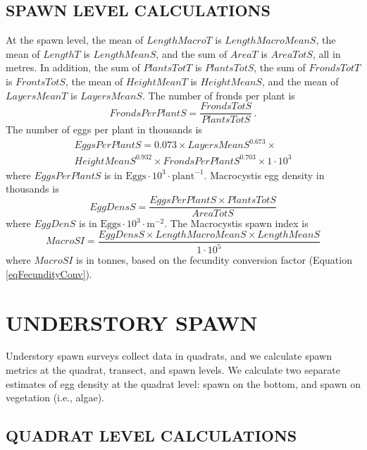 \documentclass[12pt]{article}
\begin{document}
\subsection{SPAWN LEVEL CALCULATIONS}

At the spawn level, the mean of $LengthMacroT$ is $LengthMacroMeanS$, the mean of $LengthT$ is $LengthMeanS$, and the sum of $AreaT$ is $AreaTotS$, all in metres.
In addition, the sum of $PlantsTotT$ is $PlantsTotS$, the sum of $FrondsTotT$ is $FrontsTotS$, the mean of $HeightMeanT$ is $HeightMeanS$, and the mean of $LayersMeanT$ is $LayersMeanS$. 
The number of fronds per plant is
\begin{equation}
FrondsPerPlantS = \frac{FrondsTotS} {PlantsTotS} \, .
\label{eqFrondsPerPlant}
\end{equation}
The number of eggs per plant in thousands is \citep{HaegeleSchweigert1990}
\begin{multline}
EggsPerPlantS = 0.073 \times LayersMeanS^{0.673} \times \\ 
HeightMeanS^{0.932} \times FrondsPerPlantS^{0.703} \times 1 \cdot 10^{3}
\label{eqEggsPerPlantMacro}
\end{multline}
where $EggsPerPlantS$ is in $\text{Eggs} \cdot 10^{3} \cdot \text{plant}^{-1}$. 
Macrocystis egg density in thousands is
\begin{equation}
EggDensS = \frac{EggsPerPlantS \times PlantsTotS} {AreaTotS}
\label{eqEggDensityMacro}
\end{equation}
where $EggDenS$ is in $\text{Eggs} \cdot 10^{3} \cdot \text{m}^{-2}$.
The Macrocystis spawn index is
\begin{equation}
MacroSI = \frac{EggDensS \times LengthMacroMeanS \times LengthMeanS} {1 \cdot 10^{5}}
\label{eqBiomassMacro}
\end{equation}
where $MacroSI$ is in tonnes, based on the fecundity conversion factor (Equation \ref{eqFecundityConv}).

\section{UNDERSTORY SPAWN}\label{secUnder}

Understory spawn surveys collect data in quadrats, and we calculate spawn metrics at the quadrat, transect, and spawn levels.
We calculate two separate estimates of egg density at the quadrat level: spawn on the bottom, and spawn on vegetation (i.e., algae).

\subsection{QUADRAT LEVEL CALCULATIONS}
\end{document}
